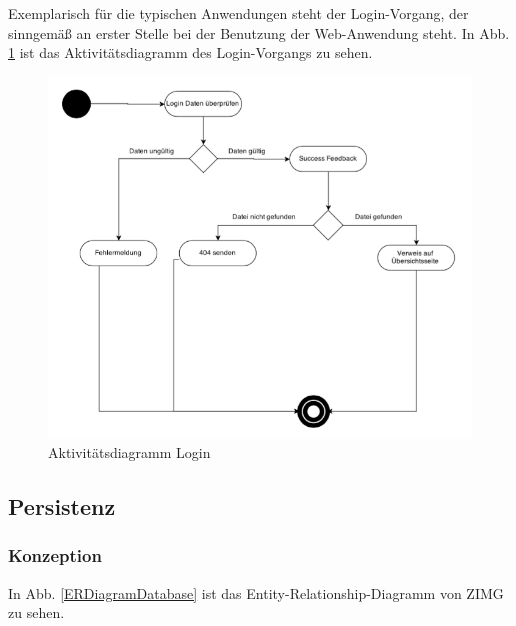 \documentclass[12pt, oneside, a4paper]{article}		%
\begin{document}
Exemplarisch für die typischen Anwendungen steht der Login-Vorgang, der sinngemäß an erster Stelle bei der Benutzung der Web-Anwendung steht. In Abb. \ref{AcitivityDiagramLogin} ist das Aktivitätsdiagramm des Login-Vorgangs zu sehen.

\begin{figure}[H]
	\centering
	\includegraphics[width=\linewidth]{footage/ZIMG_ActivityDiagram_Login} 
	\caption{Aktivitätsdiagramm Login}
	\label{AcitivityDiagramLogin}
\end{figure}

\newpage

\subsection{Persistenz}

\subsubsection{Konzeption}

In Abb. \ref{ERDiagramDatabase} ist das Entity-Relationship-Diagramm von ZIMG zu sehen.
\end{document}
